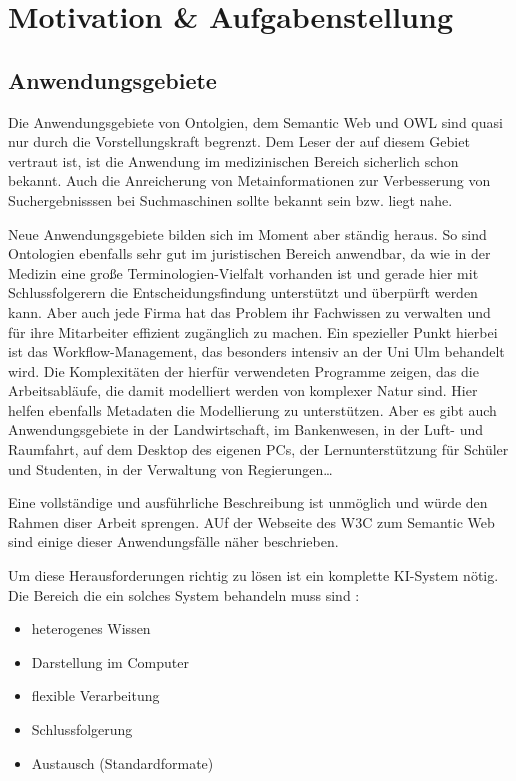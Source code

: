 \chapter{Motivation \& Aufgabenstellung}
\label{kapitel-motivation}

\section{Anwendungsgebiete}
Die Anwendungsgebiete von Ontolgien, dem Semantic Web und OWL sind quasi nur durch die Vorstellungskraft begrenzt. Dem Leser der auf diesem Gebiet vertraut ist, ist die Anwendung im medizinischen Bereich sicherlich schon bekannt. Auch die Anreicherung von Metainformationen zur Verbesserung von Suchergebnisssen bei Suchmaschinen sollte bekannt sein bzw. liegt nahe.

Neue Anwendungsgebiete bilden sich im Moment aber ständig heraus. So sind Ontologien ebenfalls sehr gut im juristischen Bereich anwendbar, da wie in der Medizin eine große Terminologien-Vielfalt vorhanden ist und gerade hier mit Schlussfolgerern die Entscheidungsfindung unterstützt und überpürft werden kann.
Aber auch jede Firma hat das Problem ihr Fachwissen zu verwalten und für ihre Mitarbeiter effizient zugänglich zu machen. Ein spezieller Punkt hierbei ist das Workflow-Management, das besonders intensiv an der Uni Ulm behandelt wird. Die Komplexitäten der hierfür verwendeten Programme zeigen, das die Arbeitsabläufe, die damit modelliert werden von komplexer Natur sind. Hier helfen ebenfalls Metadaten die Modellierung zu unterstützen.
Aber es gibt auch Anwendungsgebiete in der Landwirtschaft, im Bankenwesen, in der Luft- und Raumfahrt, auf dem Desktop des eigenen PCs, der Lernunterstützung für Schüler und Studenten, in der Verwaltung von Regierungen\ldots

Eine vollständige und ausführliche Beschreibung ist unmöglich und würde den Rahmen diser Arbeit sprengen. AUf der Webseite des W3C zum Semantic Web \cite{W3CUseCases} sind einige dieser Anwendungsfälle näher beschrieben.

Um diese Herausforderungen richtig zu lösen ist ein komplette KI-System nötig. Die Bereich die ein solches System behandeln muss sind \cite{vonHenke2009}:

\begin{itemize}
  \item heterogenes Wissen
  \item Darstellung im Computer
  \item flexible Verarbeitung
  \item Schlussfolgerung
  \item Austausch (Standardformate)
\end{itemize}

